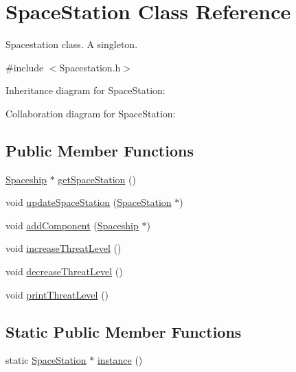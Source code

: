 \hypertarget{classSpaceStation}{}\section{Space\+Station Class Reference}
\label{classSpaceStation}


Spacestation class. A singleton.  




{\ttfamily \#include $<$Spacestation.\+h$>$}



Inheritance diagram for Space\+Station\+:


Collaboration diagram for Space\+Station\+:
\subsection*{Public Member Functions}
\begin{DoxyCompactItemize}
\item 
\hyperlink{classSpaceship}{Spaceship} $\ast$ \hyperlink{classSpaceStation_acffc1d332b904f06b55288819e69f3c8}{get\+Space\+Station} ()
\item 
void \hyperlink{classSpaceStation_acebba61d05be13cd336785ba5ee0ece5}{update\+Space\+Station} (\hyperlink{classSpaceStation}{Space\+Station} $\ast$)
\item 
void \hyperlink{classSpaceStation_af78aa518f63655701ff763461522ac7d}{add\+Component} (\hyperlink{classSpaceship}{Spaceship} $\ast$)
\item 
void \hyperlink{classSpaceStation_aa9390e8af0d69fc176c190f8f6891736}{increase\+Threat\+Level} ()
\item 
void \hyperlink{classSpaceStation_a0cb67593dc02495793635adb66f595e9}{decrease\+Threat\+Level} ()
\item 
void \hyperlink{classSpaceStation_a430ee680ac20af8245640e9271095688}{print\+Threat\+Level} ()
\end{DoxyCompactItemize}
\subsection*{Static Public Member Functions}
\begin{DoxyCompactItemize}
\item 
static \hyperlink{classSpaceStation}{Space\+Station} $\ast$ \hyperlink{classSpaceStation_aaf446a294ee415c89b91f7755ae50519}{instance} ()
\end{DoxyCompactItemize}
